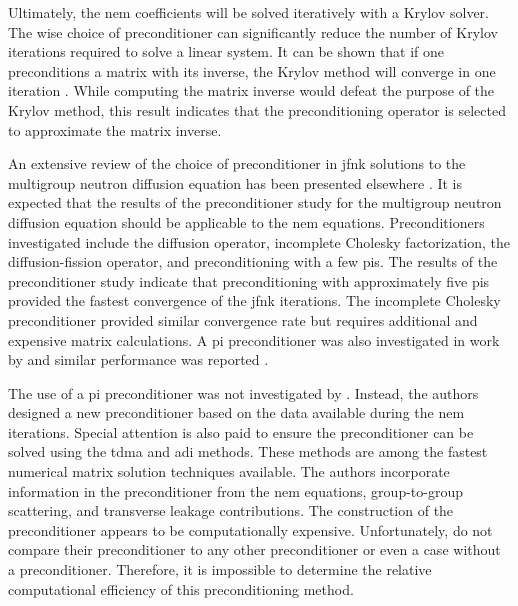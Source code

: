       Ultimately, the \gls{nem} coefficients will be solved iteratively with a
      Krylov solver. The wise choice of preconditioner can significantly reduce
      the number of Krylov iterations required to solve a linear system. It can
      be shown that if one preconditions a matrix with its inverse, the Krylov
      method will converge in one iteration \cite{textbookkelley}. While
      computing the matrix inverse would defeat the purpose of the Krylov
      method, this result indicates that the preconditioning operator is
      selected to approximate the matrix inverse.

      An extensive review of the choice of preconditioner in \gls{jfnk}
      solutions to the multigroup neutron diffusion equation has been presented
      elsewhere \cite{gill_azmy}. It is expected that the results of the
      preconditioner study for the multigroup neutron diffusion equation should
      be applicable to the \gls{nem} equations. Preconditioners investigated
      include the diffusion operator, incomplete Cholesky factorization, the
      diffusion-fission operator, and preconditioning with a few \glspl{pi}. The
      results of the preconditioner study indicate that preconditioning with
      approximately five \glspl{pi} provided the fastest convergence of the
      \gls{jfnk} iterations. The incomplete Cholesky preconditioner provided
      similar convergence rate but requires additional and expensive matrix
      calculations. A \gls{pi} preconditioner was also investigated in work by
      \citeauthor{jfnk_wielandt} and similar performance was reported
      \cite{jfnk_wielandt}.

      The use of a \gls{pi} preconditioner was not investigated by
      \citeauthor{qe2paper}. Instead, the authors designed a new preconditioner
      based on the data available during the \gls{nem} iterations. Special
      attention is also paid to ensure the preconditioner can be solved using
      the \gls{tdma} and \gls{adi} methods. These methods are among the fastest
      numerical matrix solution techniques available. The authors incorporate
      information in the preconditioner from the \gls{nem} equations,
      group-to-group scattering, and transverse leakage contributions. The
      construction of the preconditioner appears to be computationally
      expensive. Unfortunately, \citeauthor{qe2paper} do not compare their
      preconditioner to any other preconditioner or even a case without a
      preconditioner. Therefore, it is impossible to determine the relative
      computational efficiency of this preconditioning method.

